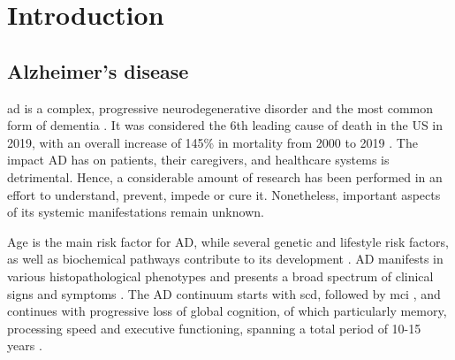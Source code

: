 \documentclass{amsart}
\newcommand{\mainmatter}{
    \newpage
    \pagenumbering{arabic}  %
}
\begin{document}


\clearpage
\printacronyms[title = Abbreviations, toctitle = Abbreviations]

\newpage
\tableofcontents

\mainmatter

\newpage
\section{Introduction}\label{Intro}
\subsection{Alzheimer’s disease}
\acrfull{ad} is a complex, progressive neurodegenerative disorder and the most common form of dementia \cite{Penke2023NewDisease}. It was considered the 6th leading cause of death in the US in 2019, with an overall increase of 145\% in mortality from 2000 to 2019 \cite{20232023Figures}. The impact AD has on patients, their caregivers, and healthcare systems is detrimental. Hence, a considerable amount of research has been performed in an effort to understand, prevent, impede or cure it. Nonetheless, important aspects of its systemic manifestations remain unknown.

Age is the main risk factor for AD, while several genetic and lifestyle risk factors, as well as biochemical pathways contribute to its development \cite{Penke2023NewDisease}. AD manifests in various histopathological phenotypes and presents a broad spectrum of clinical signs and symptoms \cite{Heneka2015NeuroinflammationDisease, Edwards2019ANeurodegeneration}. The AD continuum starts with \acrfull{scd}, followed by \acrfull{mci} \cite*{AALDIJK2022101556}, and continues with progressive loss of global cognition, of which particularly memory, processing speed and executive functioning, spanning a total period of 10-15 years \cite{Scheltens2016AlzheimersDisease}. 
\end{document}
